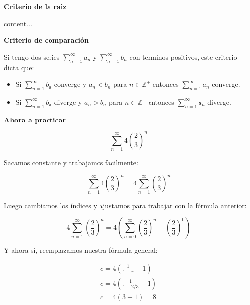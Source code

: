 \documentclass{article}
\newenvironment{formula-box}{
	\begin{tcolorbox}[
		colframe=black, %
		colback=white, %
		arc=1mm, %
		boxrule=1pt, %
		left=2mm, %
		right=2mm, %
		top=2mm, %
		bottom=2mm, %
		]
	}{
	\end{tcolorbox}
}
\newenvironment{cut-me-box}{
	\begin{tcolorbox}[
		colframe=white, %
		colback=white, %
		arc=1mm, %
		left=2mm, %
		right=2mm, %
		top=2mm, %
		bottom=2mm, %
		borderline={0.5mm}{0mm}{black!70!white,dashed},
		enhanced,
		boxrule=0.5mm,
		overlay={
			\node[anchor=north, yshift=-1mm, fill=white] at (frame.north east) {\large \emoji{scissors}}; %
		}
		]
	}{
	\end{tcolorbox}
}
\begin{document}
\begin{multicols}{2}
		\begin{formula-box}
			{\raggedright \large \textbf{Criterio de la raiz} \par}
			
			content...
		\end{formula-box}
		
		\begin{formula-box}
			{\raggedright \large \textbf{Criterio de comparación} \par}
			
			Si tengo dos series $\sum_{n=1}^{\infty} a_n$ y $\sum_{n=1}^{\infty} b_n$ con terminos positivos, este criterio dicta que:
			
			\begin{itemize}
				\item Si $\sum_{n=1}^{\infty} b_n$ converge y $a_n < b_n$ para $n \in \mathbb{Z}^+$ entonces $\sum_{n=1}^{\infty} a_n$ converge.
				
				\item Si $\sum_{n=1}^{\infty} b_n$ diverge y $a_n > b_n$ para $n \in \mathbb{Z}^+$ entonces $\sum_{n=1}^{\infty} a_n$ diverge.
			\end{itemize}
			
		\end{formula-box}
		
		\columnbreak
		
		\begin{cut-me-box}
			{\raggedright \large \textbf{Ahora a practicar} \par}
			
			\[
			\sum_{n=1}^{\infty} 4(\frac{2}{3})^n
			\]
			
			Sacamos constante y trabajamos facilmente:
			
			\[
			\sum_{n=1}^{\infty} 4(\frac{2}{3})^n =
			4 \sum_{n=1}^{\infty} (\frac{2}{3})^n
			\]
			
			Luego cambiamos los índices y ajustamos para trabajar con la fórmula anterior:
			
			\[
			4 \sum_{n=1}^{\infty} (\frac{2}{3})^n = 4 (\sum_{n=0}^{\infty} (\frac{2}{3})^n - (\frac{2}{3})^0)
			\]
			
			Y ahora sí, reemplazamos nuestra fórmula general:
			
			\[
			\begin{array}{c}
				c = 4( \frac{1}{1-r} - 1) \\
				c = 4( \frac{1}{1-2/3} - 1) \\
				c = 4( 3 - 1) = 8
			\end{array}
			\]
			

\end{cut-me-box}
\end{multicols}
\end{document}
